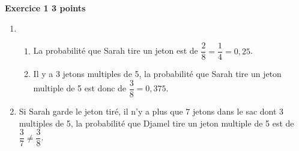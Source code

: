 \textbf{Exercice 1 \hfill 3 points}

\medskip


%
%

\begin{enumerate}
\item %
	\begin{enumerate}
		\item %
La probabilité que Sarah tire un jeton  \fg{} est de $\dfrac{2}{8}
 = \dfrac{1}{4} =  0,25$.
		\item %
Il y a 3 jetons multiples de 5, la probabilité que Sarah tire un jeton multiple de 5 est
donc de $\dfrac{3}{8} = 0,375$.
	\end{enumerate}
\item  %
	
Si Sarah garde le jeton tiré, il n’y a plus que $7$ jetons dans le sac dont $3$ multiples de
5, la probabilité que Djamel tire un jeton multiple de 5 est de
$\dfrac{3}{7} \ne \dfrac{3}{8}$.
\end{enumerate}

\vspace{0,5cm}

